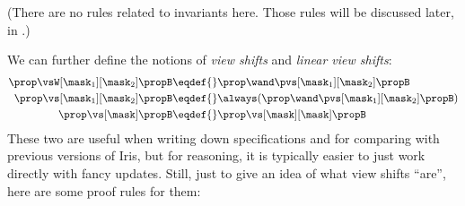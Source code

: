 (There are no rules related to invariants here. Those rules will be discussed later, in .)

We can further define the notions of \emph{view shifts} and \emph{linear view shifts}:
\begin{align*}
  \prop \vsW[\mask_1][\mask_2] \propB \eqdef{}& \prop \wand \pvs[\mask_1][\mask_2] \propB \\
  \prop \vs[\mask_1][\mask_2] \propB \eqdef{}& \always(\prop \wand \pvs[\mask_1][\mask_2] \propB) \\
  \prop \vs[\mask] \propB \eqdef{}& \prop \vs[\mask][\mask] \propB
\end{align*}
These two are useful when writing down specifications and for comparing with previous versions of Iris, but for reasoning, it is typically easier to just work directly with fancy updates.
Still, just to give an idea of what view shifts ``are'', here are some proof rules for them:

